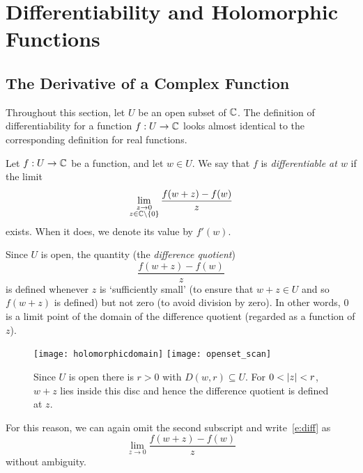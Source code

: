 
\chapter[Holomorphic Functions]{Differentiability and Holomorphic Functions}
\section{The Derivative of a Complex Function}
Throughout this section, let $U$ be an open subset of $\mathbb{C}$.  The definition of differentiability for a function $f: U \to \mathbb{C}$ looks almost identical to the corresponding definition for real functions.

\begin{definition}
Let $f: U \to \mathbb{C}$ be a function, and let $w \in U$.  We say that $f$ is \emph{differentiable at $w$} if the limit
\begin{equation}
\label{e:diff}
\lim_{\substack{z \to 0\\ z \in \mathbb{C} \backslash \left\{0\right\}}} \frac{f(w+z)-f(w)}{z}
\end{equation}
exists.  When it does, we denote its value by $f'(w)$.

\end{definition}

Since $U$ is open, the quantity (the \emph{difference quotient})
\[
\frac{f(w+z)-f(w)}{z}
\]
is defined whenever $z$ is `sufficiently small' (to ensure that $w+z \in U$ and so $f(w+z)$ is defined) but not zero (to avoid division by zero). In other words, $0$ is a limit point of the domain of the difference quotient (regarded as a function of $z$).


\begin{wrapfigure}{l}{0.5\textwidth}
\begin{framed}
\texttt{[image: holomorphicdomain]}
\texttt{[image: openset\_scan]}
\caption{Since $U$ is open there is $r>0$ with $D(w,r) \subseteq U$.  For $0<\left| z \right|<r$, $w+z$ lies inside this disc and hence the difference quotient is defined at $z$.}
\end{framed}
\end{wrapfigure}

 For this reason, we can again omit the second subscript and write~\eqref{e:diff} as
\[
\lim_{z \to 0} \frac{f(w+z)-f(w)}{z}
\]
without ambiguity.




